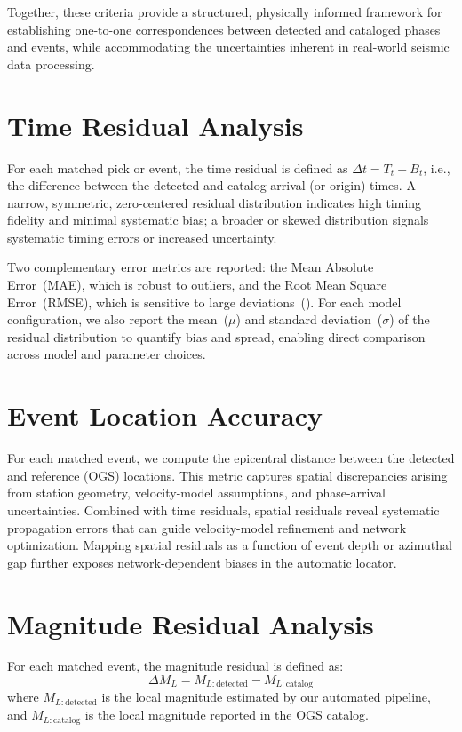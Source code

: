 Together, these criteria provide a structured, physically informed framework
for establishing one-to-one correspondences between detected and cataloged
phases and events, while accommodating the uncertainties inherent in real-world
seismic data processing.

\section{Time Residual Analysis}
For each matched pick or event, the time residual is defined as
$\Delta t = T_t - B_t$, i.e., the difference between the detected and catalog
arrival (or origin) times. A narrow, symmetric, zero-centered residual
distribution indicates high timing fidelity and minimal systematic bias; a
broader or skewed distribution signals systematic timing errors or increased
uncertainty.

Two complementary error metrics are reported: the Mean Absolute Error~(MAE),
which is robust to outliers, and the Root Mean Square Error~(RMSE), which is
sensitive to large deviations~(\cite{WhichPicker}). For each model
configuration, we also report the mean~($\mu$) and standard
deviation~($\sigma$) of the residual distribution to quantify bias and spread,
enabling direct comparison across model and parameter choices.

\section{Event Location Accuracy}
For each matched event, we compute the epicentral distance between the
detected and reference (OGS) locations. This metric captures spatial
discrepancies arising from station geometry, velocity-model assumptions, and
phase-arrival uncertainties. Combined with time residuals, spatial residuals
reveal systematic propagation errors that can guide velocity-model refinement
and network optimization. Mapping spatial residuals as a function of event
depth or azimuthal gap further exposes network-dependent biases in the
automatic locator.

\section{Magnitude Residual Analysis}
For each matched event, the magnitude residual is defined as:
\begin{equation*}
  \Delta M_L = M_{L : \text{detected}} - M_{L : \text{catalog}}
\end{equation*}
where $M_{L : \text{detected}}$ is the local magnitude estimated by our
automated pipeline, and $M_{L : \text{catalog}}$ is the local magnitude
reported in the OGS catalog.

